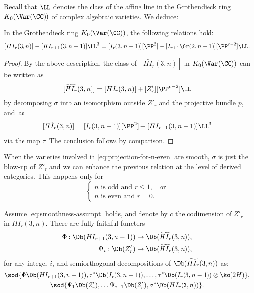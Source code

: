 Recall that $\LL$ denotes the class of the affine line in the Grothendieck ring $K_0(\Var(\CC))$ of complex algebraic varieties. We deduce:

\begin{prop}\label{prop:K0-projection}
In the Grothendieck ring $K_0(\Var(\CC))$, the following relations hold:%
\begin{equation*}\label{eq:rel-in-K0-proj}
[HI_r(3,n)] - [HI_{r+1}(3,n-1)]\LL^3 = [I_r(3,n-1)][\PP^2] - [I_{r+1} \Gr(2,n-1)][\PP^{c-2}]\LL.
\end{equation*}
\end{prop}

\begin{proof}
By the above description, the class of $[\widetilde{HI_r}(3,n)]$ in $K_0(\Var(\CC))$ can be written as
\[
[\widetilde{HI_r}(3,n)]=[HI_r(3,n)]+ [Z'_r][\PP^{c-2}]\LL
\]
by decomposing $\sigma$ into an isomorphism outside $Z'_r$ and the projective bundle $p$, and~as
\[
[\widetilde{HI_r}(3,n)]=[I_r(3,n-1)][\PP^2] + [HI_{r+1}(3,n-1)]\LL^3
\]
via the map $\tau$. The conclusion follows by comparison.
\end{proof}

When the varieties involved in \eqref{eq:projection-for-n-even} are smooth, $\sigma$
is just the blow-up of $Z'_r$ and we can enhance the previous relation at the level of
derived categories. This happens only for
\begin{equation}\label{eq:smoothness-assumpt}
\begin{cases}
n \text{ is odd and } r \leq 1,& \text{or}\\
n \text{ is even and } r=0.
\end{cases}
\end{equation}
\begin{prop}\label{prop:deco-projection}
Assume \eqref{eq:smoothness-assumpt} holds, and denote by $c$ the codimension of $Z'_r$ in $HI_r(3,n)$.
There are fully faithful functors
\begin{align*}
\Phi: \Db(HI_{r+1}(3,n-1)) &\to \Db(\widetilde{HI_r}(3,n)),\\
\Psi_i:\Db(Z'_r) &\to \Db(\widetilde{HI_r}(3,n)),
\end{align*}
for any integer $i$, and semiorthogonal decompositions of $\Db(\widetilde{HI_r}(3,n))$ as:
\begin{gather}\label{eq:our-deco-proj}
\sod{\Phi \Db(HI_{r+1}(3,n-1)),\tau^* \Db(I_r(3,n-1)), \ldots, \tau^* \Db(I_r(3,n-1)) \otimes \ko(2H)},
\\
\label{eq:Orlov-deco-proj}
\sod{\Psi_1 \Db(Z'_r),\ldots \Psi_{c-1} \Db(Z'_r), \sigma^* \Db(HI_r(3,n))}.
\end{gather}
\end{prop}


